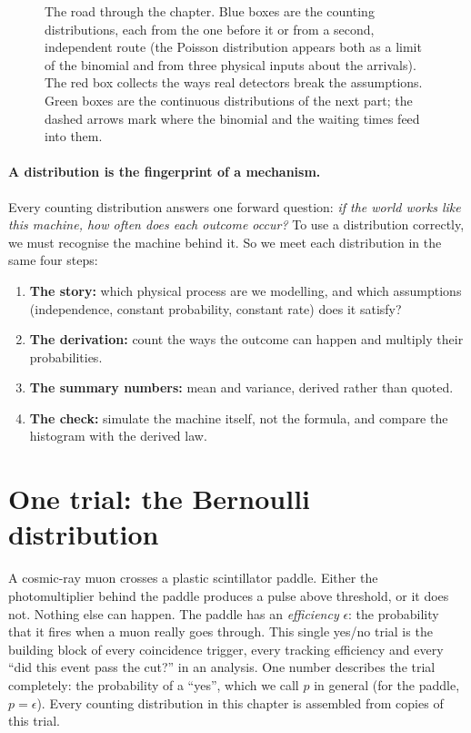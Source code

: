 \begin{figure}[htbp]
\caption{The road through the chapter. Blue boxes are the counting distributions, each from the one before it or from a second, independent route (the Poisson distribution appears both as a limit of the binomial and from three physical inputs about the arrivals). The red box collects the ways real detectors break the assumptions. Green boxes are the continuous distributions of the next part; the dashed arrows mark where the binomial and the waiting times feed into them.}
\label{2a:fig:roadmap}
\end{figure}

\paragraph{A distribution is the fingerprint of a mechanism.}
Every counting distribution answers one forward question: \emph{if the world works like this machine, how often does each outcome occur?} To use a distribution correctly, we must recognise the machine behind it. So we meet each distribution in the same four steps:
\begin{enumerate}[leftmargin=1.6em,itemsep=1pt]
  \item \textbf{The story:} which physical process are we modelling, and which assumptions (independence, constant probability, constant rate) does it satisfy?
  \item \textbf{The derivation:} count the ways the outcome can happen and multiply their probabilities.
  \item \textbf{The summary numbers:} mean and variance, derived rather than quoted.
  \item \textbf{The check:} simulate the machine itself, not the formula, and compare the histogram with the derived law.
\end{enumerate}
\section{One trial: the Bernoulli distribution}\label{2a:sec:bernoulli}

A cosmic-ray muon crosses a plastic scintillator paddle. Either the photomultiplier behind the paddle produces a pulse above threshold, or it does not. Nothing else can happen. The paddle has an \emph{efficiency} $\epsilon$: the probability that it fires when a muon really goes through. This single yes/no trial is the building block of every coincidence trigger, every tracking efficiency and every ``did this event pass the cut?'' in an analysis. One number describes the trial completely: the probability of a ``yes'', which we call $p$ in general (for the paddle, $p=\epsilon$). Every counting distribution in this chapter is assembled from copies of this trial.

